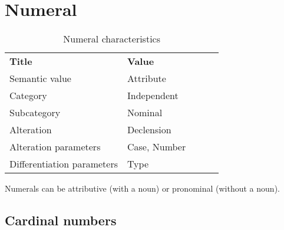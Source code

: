 \section{Numeral}

\begin{table}[h]
	\caption{Numeral characteristics}
	\begin{tabular}{lllll}
		\textbf{Title}              & \textbf{Value}      \\
		Semantic value              & Attribute           \\
		Category                    & Independent         \\
		Subcategory                 & Nominal             \\
		Alteration                  & Declension          \\
		Alteration parameters       & Case, Number        \\
		Differentiation parameters  & Type
	\end{tabular}
\end{table}

Numerals can be attributive (with a noun) or pronominal (without a noun).
	
\subsection{Cardinal numbers}

